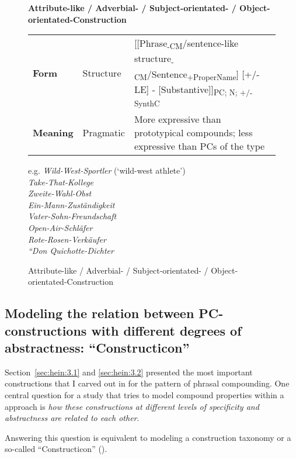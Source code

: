 \documentclass[output=paper]{LSP/langsci}
\begin{document}
\begin{figure}
\caption{Attribute-like / Adverbial- / Subject-orientated- / Object-orientated-Construction}\label{fig:hein:2.2}
\begin{framed}\raggedright\textbf{Attribute-like / Adverbial- / Subject-orientated- / Object-orientated-Construction}\\[1.5\baselineskip]
\begin{tabularx}{\linewidth}{llX}
	\textbf{Form}  &  Structure & [[Phrase\textsubscript{{}-CM}/sentence-like structure\textsubscript{{}-CM}/Sentence\textsubscript{+ProperName}] [+/-LE] - [Substantive]]\textsubscript{PC; N; +/- SynthC} \\\tablevspace
	\textbf{Meaning}  & Pragmatic  & More expressive than prototypical \isi{determinative} compounds; less expressive than PCs of the type \figref{fig:hein:2.1}
\end{tabularx}
\vspace{\baselineskip}\par
e.g. \textit{Wild-West-Sportler} (‘wild-west athlete')\\
\textit{Take-That-Kollege\\
	Zweite-Wahl-Obst\\
	Ein-Mann-Zuständigkeit\\
	Vater-Sohn-Freundschaft\\
	Open-Air-Schläfer\\
	Rote-Rosen-Verkäufer\\
	``Don Quichotte{\textquotedbl}-Dichter}
\end{framed}
\end{figure} 


\subsection{Modeling the relation between PC-constructions with different degrees of abstractness: ``Constructicon''} \label{sec:hein:3.3}
Section~\ref{sec:hein:3.1} and \ref{sec:hein:3.2} presented the most important constructions that I carved out in \citet{Hein2015} for the pattern of phrasal compounding. One central question for a study that tries to model compound properties within a   approach is \textit{how} \textit{these constructions at different levels of specificity and abstractness are related to each other}. 

Answering this question is equivalent to modeling a construction taxonomy or a so-called ``Constructicon” (\citealt[95]{ZiemLasch2013}). 
\end{document}
